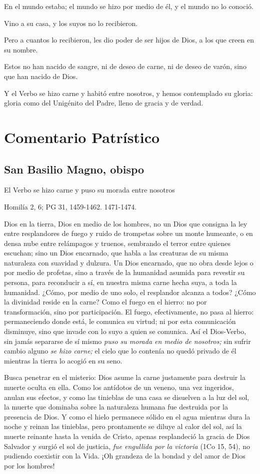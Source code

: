 \begin{body}
\begin{body}
En el mundo estaba; el mundo se hizo por medio de él, y el mundo no lo
conoció.

Vino a su casa, y los suyos no lo recibieron.

Pero a cuantos lo recibieron, les dio poder de ser hijos de Dios, a los
que creen en su nombre.

Estos no han nacido de sangre, ni de deseo de carne, ni de deseo de
varón, sino que han nacido de Dios.

Y el Verbo se hizo carne y habitó entre nosotros, y hemos contemplado su
gloria: gloria como del Unigénito del Padre, lleno de gracia y de
verdad.

\section{Comentario Patrístico}

\subsection{San Basilio Magno, obispo}

El Verbo se hizo carne y puso su morada entre nosotros

Homilía 2, 6; PG 31, 1459-1462. 1471-1474.

Dios en la tierra, Dios en medio de los hombres, no un Dios que consigna la ley entre resplandores de fuego y ruido de trompetas sobre un monte humeante, o en densa nube entre relámpagos y truenos, sembrando el terror entre quienes escuchan; sino un Dios encarnado, que habla a las creaturas de su misma naturaleza con suavidad y dulzura. Un Dios encarnado, que no obra desde lejos o por medio de profetas, sino a través de la humanidad asumida para revestir su persona, para reconducir a sí, en nuestra misma carne hecha suya, a toda la humanidad. ¿Cómo, por medio de uno solo, el resplandor alcanza a todos? ¿Cómo la divinidad reside en la carne? Como el fuego en el hierro: no por transformación, sino por participación. El fuego, efectivamente, no pasa al hierro: permaneciendo donde está, le comunica su virtud; ni por esta comunicación disminuye, sino que invade con lo suyo a quien se comunica. Así el Dios-Verbo, sin jamás separarse de sí mismo \emph{puso su morada en medio de nosotros;} sin sufrir cambio alguno \emph{se hizo carne;} el cielo que lo contenía no quedó privado de él mientras la tierra lo acogió en su seno.

Busca penetrar en el misterio: Dios asume la carne justamente para destruir la muerte oculta en ella. Como los antídotos de un veneno, una vez ingeridos, anulan sus efectos, y como las tinieblas de una casa se disuelven a la luz del sol, la muerte que dominaba sobre la naturaleza humana fue destruida por la presencia de Dios. Y como el hielo permanece sólido en el agua mientras dura la noche y reinan las tinieblas, pero prontamente se diluye al calor del sol, así la muerte reinante hasta la venida de Cristo, apenas resplandeció la gracia de Dios Salvador y surgió el sol de justicia, \emph{fue engullida por la victoria} (1Co 15, 54), no pudiendo coexistir con la Vida. ¡Oh grandeza de la bondad y del amor de Dios por los hombres!


\end{body}
\end{body}
